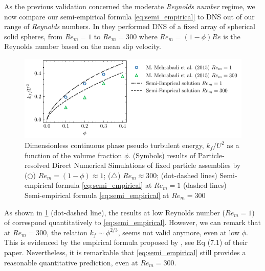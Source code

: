 As the previous validation concerned the moderate \textit{Reynolds number} regime, we now compare our semi-empirical formula \eqref{eq:semi_empirical} to DNS out of our range of \textit{Reynolds} numbers. 
In \citet{mehrabadi2015pseudo} they performed DNS of a fixed array of spherical solid spheres, from $Re_m = 1$ to $Re_m=300$ where $Re_m = (1- \phi) Re$ is the Reynolds number based on the mean slip velocity. 
\begin{figure}
    \centering
    \includegraphics[height = 0.25\textwidth]{image/HOMOGENEOUS_final/CA/tenneti.pdf}
    \caption{Dimensionless continuous phase pseudo turbulent energy, $k_f/U^2$ as a function of the volume fraction $\phi$.
    (Symbols) 
    results of Particle-resolved Direct Numerical Simulations
    of fixed particle assemblies by \citet{mehrabadi2015pseudo}
    ($\pmb\bigcirc$) $Re_m = (1-\phi) \approx 1$; ($\pmb\triangle$) $Re_m \approx 300$;
    (dot-dashed lines) Semi-empirical formula \ref{eq:semi_empirical} at $Re_m = 1$
    (dashed lines) Semi-empirical formula \ref{eq:semi_empirical} at $Re_m = 300$
    }
    \label{fig:tennet}
\end{figure}
As shown in \ref{fig:tennet} (dot-dashed line), the results at low Reynolds number ($Re_m=1$) of \citet{mehrabadi2015pseudo}  correspond quantitatively to \eqref{eq:semi_empirical}. 
However, we can remark that at $Re_m = 300$, the relation $k_f \sim \phi^{2/3}$, seems not valid anymore, even at low $\phi$. 
This is evidenced by the empirical formula proposed by \citet{mehrabadi2015pseudo}, see Eq (7.1) of their paper. 
Nevertheless, it is remarkable that \ref{eq:semi_empirical} still provides a reasonable quantitative prediction, even at $Re_m = 300$. 


